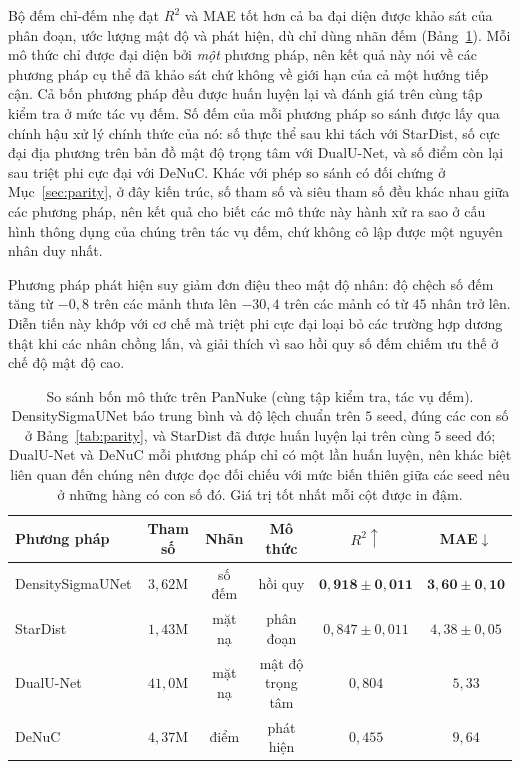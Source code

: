 \documentclass[preprint,12pt]{elsarticle}
\begin{document}
Bộ đếm chỉ-đếm nhẹ đạt $R^2$ và MAE tốt hơn cả ba đại diện được khảo sát của phân đoạn, ước lượng mật độ và phát
hiện, dù chỉ dùng nhãn đếm (Bảng~\ref{tab:paradigm}). Mỗi mô thức chỉ được đại diện bởi \emph{một} phương pháp,
nên kết quả này nói về các phương pháp cụ thể đã khảo sát chứ không về giới hạn của cả một hướng tiếp cận. Cả bốn
phương pháp đều được huấn luyện lại và đánh giá trên cùng tập kiểm tra ở mức tác vụ đếm. Số đếm của mỗi phương
pháp so sánh được lấy qua chính hậu xử lý chính thức của nó: số thực thể sau khi tách với StarDist, số cực đại địa
phương trên bản đồ mật độ trọng tâm với DualU-Net, và số điểm còn lại sau triệt phi cực đại với DeNuC. Khác với
phép so sánh có đối chứng ở Mục~\ref{sec:parity}, ở đây kiến trúc, số tham số và siêu tham số đều khác nhau giữa
các phương pháp, nên kết quả cho biết các mô thức này hành xử ra sao ở cấu hình thông dụng của chúng trên tác vụ
đếm, chứ không cô lập được một nguyên nhân duy nhất.

Phương pháp phát hiện suy giảm đơn điệu theo mật độ nhân: độ chệch số đếm tăng từ $-0{,}8$ trên các mảnh thưa lên
$-30{,}4$ trên các mảnh có từ $45$ nhân trở lên. Diễn tiến này khớp với cơ chế mà triệt phi cực đại loại bỏ các
trường hợp dương thật khi các nhân chồng lấn, và giải thích vì sao hồi quy số đếm chiếm ưu thế ở chế độ mật độ
cao.

\begin{table}[!htbp]
\centering
\caption{So sánh bốn mô thức trên PanNuke (cùng tập kiểm tra, tác vụ đếm). DensitySigmaUNet báo trung bình và độ
lệch chuẩn trên $5$ seed, đúng các con số ở Bảng~\ref{tab:parity}, và StarDist đã được huấn luyện lại trên cùng
$5$ seed đó; DualU-Net và DeNuC mỗi phương pháp chỉ có một lần huấn luyện, nên khác biệt liên quan đến chúng nên
được đọc đối chiếu với mức biến thiên giữa các seed nêu ở những hàng có con số đó. Giá trị tốt nhất mỗi cột được in đậm.}\label{tab:paradigm}
\small
\begin{tabular}{@{}lccccc@{}}
\toprule
Phương pháp & Tham số & Nhãn & Mô thức & $R^2\uparrow$ & MAE$\downarrow$ \\
\midrule
DensitySigmaUNet & $3{,}62$M & số đếm & hồi quy & $\mathbf{0{,}918\pm0{,}011}$ & $\mathbf{3{,}60\pm0{,}10}$ \\
StarDist~\cite{stardist} & $1{,}43$M & mặt nạ & phân đoạn & $0{,}847\pm0{,}011$ & $4{,}38\pm0{,}05$ \\
DualU-Net~\cite{dualunet} & $41{,}0$M & mặt nạ & mật độ trọng tâm & $0{,}804$ & $5{,}33$ \\
DeNuC~\cite{denuc} & $4{,}37$M & điểm & phát hiện & $0{,}455$ & $9{,}64$ \\
\bottomrule
\end{tabular}
\end{table}
\end{document}
